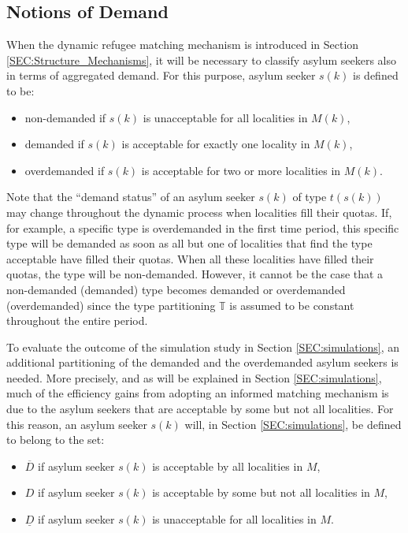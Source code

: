 \documentclass[12pt,fleqn]{article}
\begin{document}
\subsection{Notions of Demand}
When the dynamic refugee matching mechanism is introduced in Section \ref{SEC:Structure_Mechanisms}, it will be necessary to classify asylum seekers also in terms of aggregated demand. For this purpose, asylum seeker $s(k)$ is defined to be:
\begin{itemize}
\item non-demanded if $s(k)$ is unacceptable for all localities in $M(k)$,

\item demanded if $s(k)$ is acceptable for exactly one locality in $M(k)$,

\item overdemanded if $s(k)$ is acceptable for two or more localities in $M(k)$.
\end{itemize}
\noindent Note that the ``demand status'' of an asylum seeker $s(k)$ of type $t(s(k))$ may change throughout the dynamic process when localities fill their quotas. If, for example, a specific type is overdemanded in the first time period, this specific type will be demanded as soon as all but one of localities that find the type acceptable have filled their quotas. When all these localities have filled their quotas, the type will be non-demanded. However, it cannot be the case that a non-demanded (demanded) type becomes demanded or overdemanded (overdemanded) since the type partitioning $\mathbb{T}$ is assumed to be constant throughout the entire period.

To evaluate the outcome of the simulation study in Section \ref{SEC:simulations}, an additional partitioning of the demanded and the overdemanded asylum seekers is needed. More precisely, and as will be explained in Section \ref{SEC:simulations}, much of the efficiency gains from adopting an informed matching mechanism is due to the asylum seekers that are acceptable by some but not all localities. For this reason, an asylum seeker $s(k)$ will, in Section \ref{SEC:simulations}, be defined to belong to the set:
\begin{itemize}
\item $\overline{D}$ if asylum seeker $s(k)$ is acceptable by all localities in $M$,

\item $D$ if asylum seeker $s(k)$ is acceptable by some but not all localities in $M$,

\item $\underline{D}$ if asylum seeker $s(k)$ is unacceptable for all localities in $M$.
\end{itemize}
\end{document}

